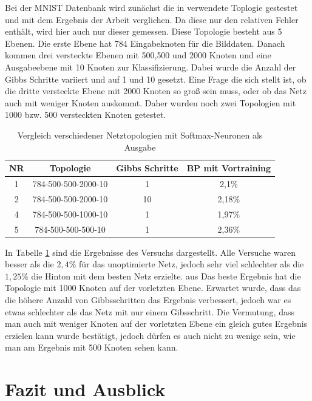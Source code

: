 \documentclass[12pt]{article}
\begin{document}
	Bei der MNIST Datenbank wird zunächst die in \cite{learning} verwendete Toplogie gestestet und mit dem Ergebnis der Arbeit verglichen. Da diese nur den relativen Fehler enthält, wird hier auch nur dieser gemessen. Diese Topologie besteht aus 5 Ebenen. Die erste Ebene hat 784 Eingabeknoten für die Bilddaten. Danach kommen drei versteckte Ebenen mit 500,500 und 2000 Knoten und eine Ausgabeebene mit 10 Knoten zur Klassifizierung. Dabei wurde die Anzahl der Gibbs Schritte variiert und auf 1 und 10 gesetzt. Eine Frage die sich stellt ist, ob die dritte versteckte Ebene mit 2000 Knoten so groß sein muss, oder ob das Netz auch mit weniger Knoten auskommt. Daher wurden noch zwei Topologien mit 1000 bzw. 500 versteckten Knoten getestet.
	\begin{table}[H]
	\center
\begin{tabular}{|c|c|c|c|}
	\hline
	NR & Topologie &Gibbs Schritte& BP mit Vortraining
	\\\hline
	1&784-500-500-2000-10&1&2,1\%\\\hline
	2&784-500-500-2000-10&10&2,18\%\\\hline
	4&784-500-500-1000-10&1&1,97\%\\\hline
	5&784-500-500-500-10&1&2,36\%\\\hline
	\end{tabular}
	\caption{Vergleich verschiedener Netztopologien mit Softmax-Neuronen als Ausgabe}
	\label{MNIST}
	\end{table}
	
	In Tabelle \ref{MNIST} sind die Ergebnisse des Versuchs dargestellt. Alle Versuche waren besser als die $2,4\%$ \cite{learning} für das unoptimierte Netz, jedoch sehr viel schlechter als die $1,25\%$ die Hinton mit dem besten Netz erzielte. aus  Das beste Ergebnis hat die Topologie mit 1000 Knoten auf der vorletzten Ebene. Erwartet wurde, dass das die höhere Anzahl von Gibbsschritten das Ergebnis verbessert, jedoch war es etwas schlechter als das Netz mit nur einem Gibsschritt. Die Vermutung, dass man auch mit weniger Knoten auf der vorletzten Ebene ein gleich gutes Ergebnis erzielen kann wurde bestätigt, jedoch dürfen es auch nicht zu wenige sein, wie man am Ergebnis mit 500 Knoten sehen kann.
	
	


\newpage

\section{Fazit und Ausblick}
\end{document}

